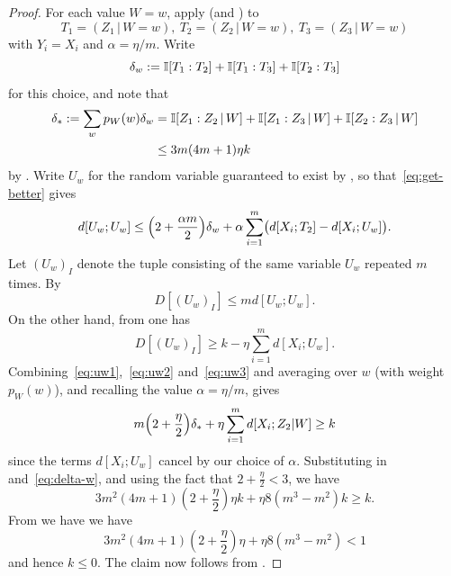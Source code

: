 \begin{proof}\leanok For each value $W=w$, apply  (and ) to
  \[
    T_1 = (Z_1 \,|\, W \mathop{=} w),\
    T_2 = (Z_2 \,|\, W \mathop{=} w),\
    T_3 = (Z_3 \,|\, W \mathop{=} w)
  \]
  with $Y_i=X_i$ and $\alpha=\eta/m$.  Write
  \[
    \delta_w :=  \mathbb{I}[T_1 : T_2] + \mathbb{I}[T_1 : T_3] + \mathbb{I}[T_2 : T_3]
  \]
  for this choice, and note that
  \begin{align}
    \label{eq:delta-w}
    \nonumber
    \delta_\ast := \sum_w p_W(w) \delta_w &= \mathbb{I}[Z_1 : Z_2 \,|\, W] + \mathbb{I}[Z_1 : Z_3 \,|\, W] + \mathbb{I}[Z_2 : Z_3 \,|\, W] \\
                           & \leq 3 m (4m+1) \eta k
  \end{align}
  by \Cref{prop:52}.
  Write $U_w$ for the random variable guaranteed to exist by ,
  so that~\eqref{eq:get-better} gives \begin{equation}
    \label{eq:uw1}
    d[U_w; U_w] \leq \Bigl( 2 + \frac{\alpha m}{2} \Bigr) \delta_w + \alpha \sum_{i=1}^m \bigl( d[X_i; T_2] - d[X_i; U_w] \bigr).
  \end{equation}
  Let $(U_w)_I$ denote the tuple consisting of the same variable $U_w$ repeated $m$ times.
  By 
  \begin{equation}
    \label{eq:uw2}
    D[(U_w)_I] \leq m d[U_w; U_w].
  \end{equation}
  On the other hand, from  one has
  \begin{equation}
    \label{eq:uw3}
    D[(U_w)_I] \geq k - \eta \sum_{i=1}^m d[X_i;U_w].
  \end{equation}
  Combining~\eqref{eq:uw1},~\eqref{eq:uw2} and~\eqref{eq:uw3} and averaging over $w$ (with weight $p_W(w)$), and recalling the value $\alpha=\eta/m$, gives
  \[
     m \Bigl( 2 + \frac{\eta}{2} \Bigr) \delta_\ast + \eta \sum_{i=1}^m d[X_i; Z_2 | W]
    \geq k
  \]
  since the terms $d[X_i; U_w]$ cancel by our choice of $\alpha$.
  Substituting in  and~\eqref{eq:delta-w}, and using the fact that $2 + \frac{\eta}{2} < 3$, we have
  \[
    3 m^2 (4m+1) (2+\frac{\eta}{2}) \eta k + \eta 8(m^3-m^2) k \geq k.
  \]
  From \Cref{eta-def-multi} we have we have
  $$ 3 m^2 (4m+1) (2+\frac{\eta}{2}) \eta + \eta 8(m^3-m^2) < 1$$
  and hence $k \leq 0$.  The claim now follows from .
\end{proof}

